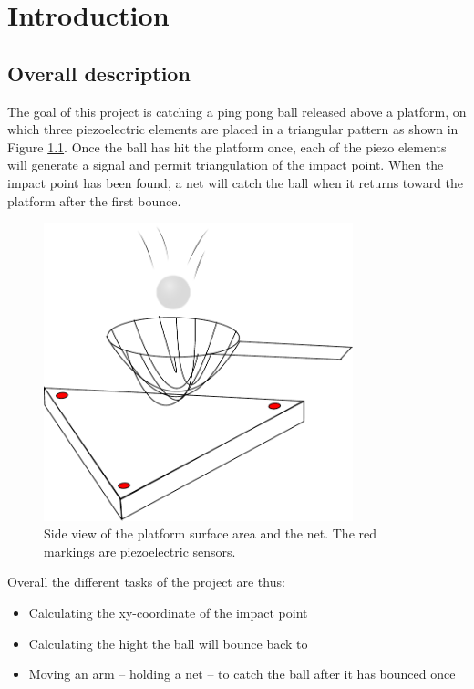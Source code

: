 \chapter{Introduction}
\label{chap:introduction}

\section{Overall description}
The goal of this project is catching a ping pong ball released above a platform, on which three piezoelectric elements are placed in a triangular pattern as shown in Figure \ref{fig:sideview}. Once the ball has hit the platform once, each of the piezo elements will generate a signal and permit triangulation of the impact point. When the impact point has been found, a net will catch the ball when it returns toward the platform after the first bounce.

\begin{figure}[htb]
	\centering
	\includegraphics[width=0.8\textwidth]{figures/sideview}
	\caption{Side view of the platform surface area and the net. The red markings are piezoelectric sensors.}
	\label{fig:sideview}
\end{figure}

Overall the different tasks of the project are thus:
\begin{itemize}
	\item Calculating the xy-coordinate of the impact point
	\item Calculating the hight the ball will bounce back to
	\item Moving an arm -- holding a net -- to catch the ball after it has bounced once
\end{itemize}

